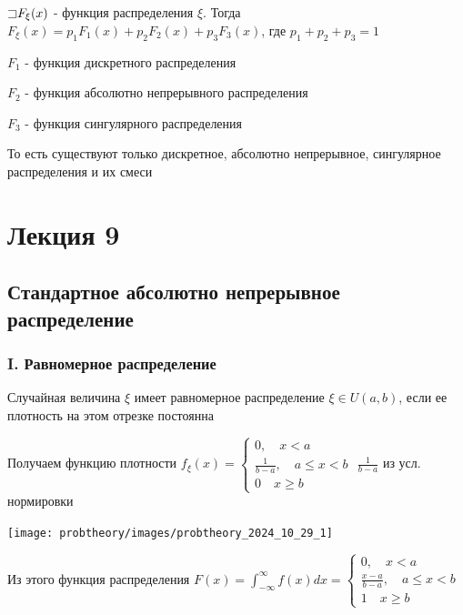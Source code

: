 \documentclass[12pt]{article}
\begin{document}
    \hypertarget{lebesguetheorem}{}

    \begin{MyTheorem}

        $\mathord{\sqsupset} F_\xi(x)$ - функция распределения $\xi$. Тогда $F_\xi(x) = p_1 F_1(x) + p_2 F_2(x) + p_3 F_3(x)$, где $p_1 + p_2 + p_3 = 1$

        $F_1$ - функция дискретного распределения

        $F_2$ - функция абсолютно непрерывного распределения

        $F_3$ - функция сингулярного распределения

        То есть существуют только дискретное, абсолютно непрерывное, сингулярное распределения и их смеси
    \end{MyTheorem}


    \section{Лекция 9}

    \subsection{Стандартное абсолютно непрерывное распределение}

    \hypertarget{uniformdistribution}{}

    \subsubsection{I. Равномерное распределение}

    \Defs Случайная величина $\xi$ имеет равномерное распределение $\xi \in U(a, b)$, если ее плотность
    на этом отрезке постоянна

    Получаем функцию плотности $f_\xi(x) = \begin{cases}0, \quad x < a \\ \frac{1}{b - a}, \quad a \leq x < b \\ 0 \quad x \geq b\end{cases}$ \hfill {\scriptsize $\frac{1}{b - a}$ из усл. нормировки}

    \texttt{[image: probtheory/images/probtheory\_2024\_10\_29\_1]}

    Из этого функция распределения $F(x) = \int_{-\infty}^\infty f(x)dx = \begin{cases}0, \quad x < a \\ \frac{x - a}{b - a}, \quad a \leq x < b \\ 1 \quad x \geq b\end{cases}$
\end{document}
